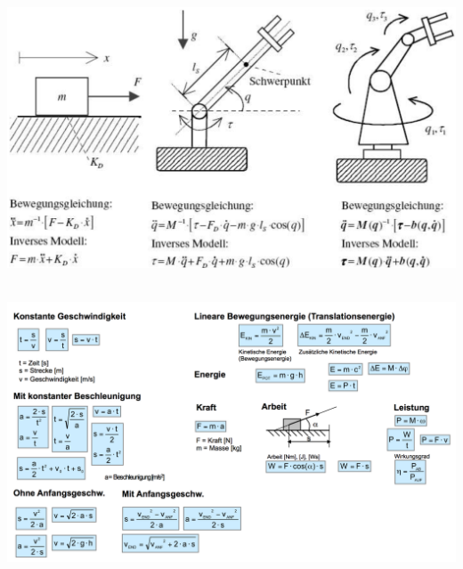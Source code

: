 \begin{minipage}{0.7\linewidth}
    \includegraphics[width=\linewidth]{./bilder/DynMod}
\end{minipage}\\
\includegraphics[width=17cm]{./bilder/kinematik}


